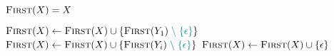 
\begin{algorithm}[H]
\begin{algorithmic}[1]
    \pause
      
      \State $\textsc{First}(X) = X$
    \EndIf

    \pause
    \hStatex
     
      \State $\textsc{First}(X) \gets \textsc{First}(X) \cup \{\textsc{First}(Y_{1}) \;\textcolor{teal}{\setminus\; \{\epsilon\}}\}$
            \State $\textsc{First}(X) \gets \textsc{First}(X) \cup \{\textsc{First}(Y_{i}) \;\textcolor{teal}{\setminus\; \{\epsilon\}}\}$
          \EndIf
      \EndFor
      \pause
       
        \State $\textsc{First}(X) \gets \textsc{First}(X) \cup \{\epsilon\}$
      \EndIf
    \EndFor
  \EndProcedure
\end{algorithmic}
\end{algorithm}